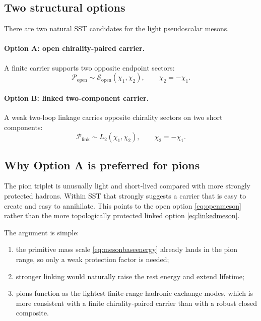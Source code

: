 \documentclass[11pt,a4paper]{article}
\begin{document}
\subsection{Two structural options}
There are two natural SST candidates for the light pseudoscalar mesons.

\paragraph{Option A: open chirality-paired carrier.}
A finite carrier supports two opposite endpoint sectors:
\begin{equation}
\mathcal{P}_{\text{open}}
\sim
\mathcal{S}_{\text{open}}(\chi_{1},\chi_{2}),
\qquad
\chi_{2}=-\chi_{1}.
\label{eq:openmeson}
\end{equation}

\paragraph{Option B: linked two-component carrier.}
A weak two-loop linkage carries opposite chirality sectors on two short components:
\begin{equation}
\mathcal{P}_{\text{link}}
\sim
L_{2}(\chi_{1},\chi_{2}),
\qquad
\chi_{2}=-\chi_{1}.
\label{eq:linkedmeson}
\end{equation}

\subsection{Why Option A is preferred for pions}
The pion triplet is unusually light and short-lived compared with more strongly protected hadrons. Within SST that strongly suggests a carrier that is easy to create and easy to annihilate. This points to the open option \eqref{eq:openmeson} rather than the more topologically protected linked option \eqref{eq:linkedmeson}.

The argument is simple:
\begin{enumerate}[label=(\arabic*)]
    \item the primitive mass scale \eqref{eq:mesonbaseenergy} already lands in the pion range, so only a weak protection factor is needed;
    \item stronger linking would naturally raise the rest energy and extend lifetime;
    \item pions function as the lightest finite-range hadronic exchange modes, which is more consistent with a finite chirality-paired carrier than with a robust closed composite.
\end{enumerate}
\end{document}
